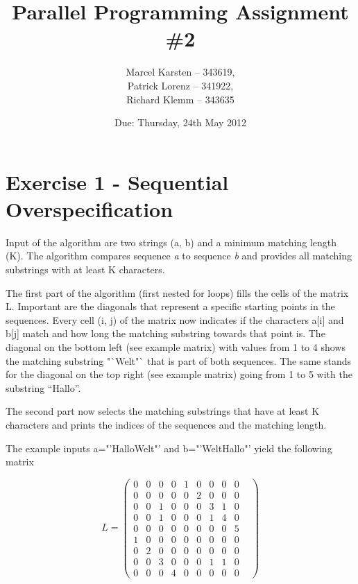 \documentclass[a4paper,twoside,11pt]{article}
\begin{document}
\pagestyle{fancyplain}

\title{Parallel Programming Assignment \#2} 
\author{Marcel Karsten -- 343619,\\ Patrick Lorenz -- 341922,\\ Richard Klemm -- 343635 }
\date{Due: Thursday, 24th May 2012} %
\maketitle

\lhead{}
\renewcommand{\headrulewidth}{0px}



\section{Exercise 1 - Sequential Overspecification}
Input of the algorithm are two strings (a, b) and a minimum matching length (K). The algorithm compares sequence \textit{a} to sequence \textit{b} and provides all matching substrings with at least K characters.

The first part of the algorithm (first nested for loops) fills the cells of the matrix L. Important are the diagonals that represent a specific starting points in the sequences. Every cell (i, j) of the matrix now indicates if the characters a[i] and b[j] match and how long the matching substring towards that point is. The diagonal on the bottom left (see example matrix) with values from 1 to 4 shows the matching substring "`Welt"` that is part of both sequences. The same stands for the diagonal on the top right (see example matrix) going from 1 to 5 with the substring "`Hallo"'.

The second part now selects the matching substrings that have at least K characters and prints the indices of the sequences and the matching length.


The example inputs a="'HalloWelt"' and b="'WeltHallo"' yield the following matrix 

$$L=
\begin{pmatrix}
	0 & 0 & 0 & 0 & 1 & 0 & 0 & 0 & 0 & \\
	0 & 0 & 0 & 0 & 0 & 2 & 0 & 0 & 0 & \\
	0 & 0 & 1 & 0 & 0 & 0 & 3 & 1 & 0 & \\
	0 & 0 & 1 & 0 & 0 & 0 & 1 & 4 & 0 & \\
	0 & 0 & 0 & 0 & 0 & 0 & 0 & 0 & 5 & \\
	1 & 0 & 0 & 0 & 0 & 0 & 0 & 0 & 0 & \\
	0 & 2 & 0 & 0 & 0 & 0 & 0 & 0 & 0 & \\
	0 & 0 & 3 & 0 & 0 & 0 & 1 & 1 & 0 & \\
	0 & 0 & 0 & 4 & 0 & 0 & 0 & 0 & 0 &
\end{pmatrix}
$$
\end{document}
